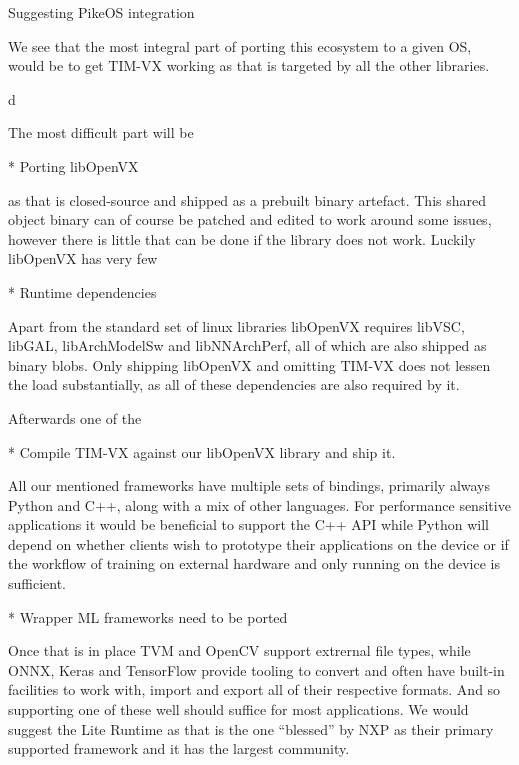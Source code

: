 \chap Suggesting PikeOS integration

We see that the most integral part of
porting this ecosystem to a given OS,
would be to get TIM-VX working as
that is targeted by all the other
libraries.

\begitems \style d

The most difficult part will be

* {Porting libOpenVX}

as that is closed-source and shipped as a prebuilt
binary artefact.
This shared object binary can of course be patched
and edited to work around some issues,
however there is little that can be done
if the library does not work.
Luckily libOpenVX has very few

* {Runtime dependencies}

Apart from the standard set of linux libraries
libOpenVX requires libVSC, libGAL, libArchModelSw and libNNArchPerf,
all of which are also shipped as binary blobs.
Only shipping libOpenVX and omitting TIM-VX
does not lessen the load substantially,
as all of these dependencies are also required by it.

Afterwards one of the 

* {Compile TIM-VX against our libOpenVX library and ship it.}

All our mentioned frameworks have multiple sets of bindings,
primarily always Python and C++, along with a mix of other languages.
For performance sensitive applications it would be beneficial
to support the C++ API while Python will depend on
whether clients wish to prototype their applications
on the device or if the workflow
of training on external hardware and only running on the device
is sufficient.

* {Wrapper ML frameworks need to be ported}

Once that is in place TVM and OpenCV support extrernal
file types,
while ONNX, Keras and TensorFlow
provide tooling to convert and
often have built-in facilities to work with,
import and export
all of their respective formats.
And so supporting one of these well should
suffice for most applications.
We would suggest the Lite Runtime as that is the one ``blessed''
by NXP as their primary supported framework
and it has the largest community.

\enditems


